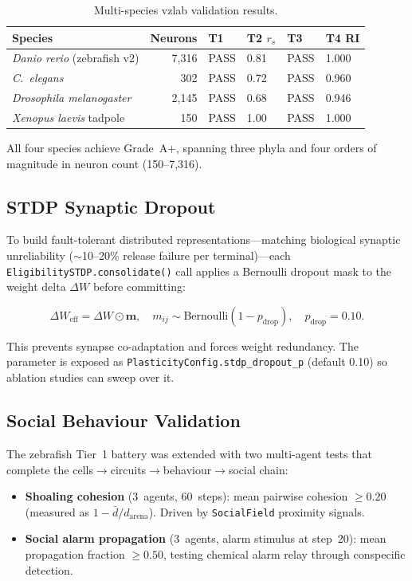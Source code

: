 \documentclass[11pt,a4paper]{article}
\begin{document}
\begin{table}[h]
\centering
\caption{Multi-species vzlab validation results.}
\begin{tabular}{lrllll}
\toprule
Species & Neurons & T1 & T2 $r_s$ & T3 & T4 RI \\
\midrule
\textit{Danio rerio} (zebrafish v2) & 7,316 & PASS & 0.81 & PASS & 1.000 \\
\textit{C.\ elegans}                 & 302   & PASS & 0.72 & PASS & 0.960 \\
\textit{Drosophila melanogaster}     & 2,145 & PASS & 0.68 & PASS & 0.946 \\
\textit{Xenopus laevis} tadpole      & 150   & PASS & 1.00 & PASS & 1.000 \\
\bottomrule
\end{tabular}
\end{table}

\noindent All four species achieve Grade~A+, spanning three phyla and
four orders of magnitude in neuron count (150--7,316).

\subsection{STDP Synaptic Dropout}

To build fault-tolerant distributed representations---matching
biological synaptic unreliability ($\sim$10--20\% release
failure per terminal)---each \texttt{EligibilitySTDP.consolidate()}
call applies a Bernoulli dropout mask to the weight delta $\Delta W$
before committing:

\begin{equation}
\Delta W_\text{eff} = \Delta W \odot \mathbf{m}, \quad
m_{ij} \sim \text{Bernoulli}(1 - p_\text{drop}), \quad
p_\text{drop} = 0.10.
\end{equation}

This prevents synapse co-adaptation and forces weight redundancy.
The parameter is exposed as \texttt{PlasticityConfig.stdp\_dropout\_p}
(default 0.10) so ablation studies can sweep over it.

\subsection{Social Behaviour Validation}

The zebrafish Tier~1 battery was extended with two multi-agent tests
that complete the cells$\to$circuits$\to$behaviour$\to$social chain:

\begin{itemize}
\item \textbf{Shoaling cohesion} (3~agents, 60~steps): mean
  pairwise cohesion $\geq 0.20$ (measured as
  $1 - \bar{d}/d_\text{arena}$).
  Driven by \texttt{SocialField} proximity signals.
\item \textbf{Social alarm propagation} (3~agents, alarm stimulus
  at step~20): mean propagation fraction $\geq 0.50$, testing
  chemical alarm relay through conspecific detection.
\end{itemize}
\end{document}
